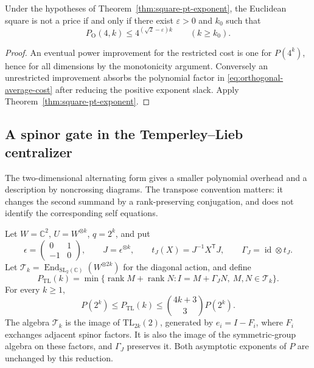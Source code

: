 \begin{corollary}
\label{cor:orthogonal-price-gate}
Under the hypotheses of Theorem~\ref{thm:square-pt-exponent},
the Euclidean square is not a price if and only if there exist
$\varepsilon>0$ and $k_0$ such that
\[
 P_{\mathrm O}(4,k)\le4^{(\sqrt2-\varepsilon)k}
 \qquad(k\ge k_0).
\]
\end{corollary}

\begin{proof}
An eventual power improvement for the restricted cost is one for
$P(4^k)$, hence for all dimensions by the monotonicity argument.
Conversely an unrestricted improvement absorbs the polynomial
factor in \eqref{eq:orthogonal-average-cost} after reducing the
positive exponent slack. Apply Theorem~\ref{thm:square-pt-exponent}.
\end{proof}

\subsection{A spinor gate in the Temperley--Lieb centralizer}

The two-dimensional alternating form gives a smaller polynomial
overhead and a description by noncrossing diagrams. The transpose
convention matters: it changes the second summand by a rank-preserving
conjugation, and does not identify the corresponding self equations.

\begin{proposition}
\label{prop:temperley-lieb-gate}
Let $W=\mathbb C^2$, $U=W^{\otimes k}$, $q=2^k$, and put
\[
 \epsilon=\begin{pmatrix}0&1\\-1&0\end{pmatrix},\qquad
 J=\epsilon^{\otimes k},\qquad
 t_J(X)=J^{-1}X^{\mathsf T}J,\qquad
 \Gamma_J=\operatorname{id}\otimes t_J.
\]
Let $\mathcal T_k=\operatorname{End}_{\mathrm{SL}_2(\mathbb C)}
(W^{\otimes2k})$ for the diagonal action, and define
\[
 P_{\mathrm{TL}}(k)=
 \min\{\operatorname{rank}M+\operatorname{rank}N:
 I=M+\Gamma_JN,\ M,N\in\mathcal T_k\}.
\]
For every $k\ge1$,
\begin{equation}\label{eq:temperley-lieb-overhead}
 P(2^k)\le P_{\mathrm{TL}}(k)
       \le\binom{4k+3}{3}P(2^k).
\end{equation}
The algebra $\mathcal T_k$ is the image of
$\mathrm{TL}_{2k}(2)$, generated by $e_i=I-F_i$, where $F_i$
exchanges adjacent spinor factors. It is also the image of the
symmetric-group algebra on these factors, and $\Gamma_J$ preserves
it. Both asymptotic exponents of $P$ are unchanged by this reduction.
\end{proposition}

